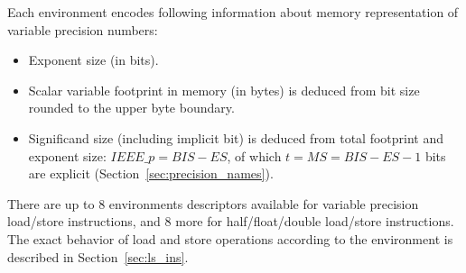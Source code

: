 Each environment encodes following information about memory representation of variable precision numbers:
\begin{itemize}[topsep=0pt]
\item Exponent size (in bits).
\item Scalar variable footprint in memory (in bytes) is deduced from bit size rounded to the upper byte boundary.
\item Significand size (including implicit bit) is deduced from total footprint and exponent size: $IEEE\_p = BIS - ES$, of which $t = MS = BIS - ES - 1$ bits are explicit (Section~\ref{sec:precision_names}).
\end{itemize}
There are up to 8 environments descriptors available for variable precision load/store instructions, and 8 more for half/float/double load/store instructions.
The exact behavior of load and store operations according to the environment is described in Section~\ref{sec:ls_ins}.
